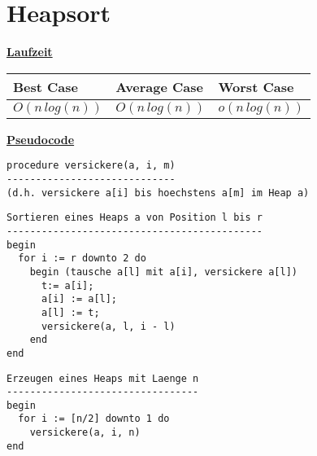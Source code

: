 \documentclass[a4paper]{report}
\begin{document}
\chapter*{Heapsort}

\underline{\bf{Laufzeit}}

\begin{tabular}{|l|l|l|}
\hline
Best Case    & Average Case  &  Worst Case\\ \hline
$O(n\,log(n))$ & $O(n\,log(n))$  &  $o(n\,log(n))$  \\ \hline
\end{tabular}

\underline{\bf{Pseudocode}}

\begin{lstlisting}
procedure versickere(a, i, m)
-----------------------------
(d.h. versickere a[i] bis hoechstens a[m] im Heap a)
\end{lstlisting}

\begin{lstlisting}
Sortieren eines Heaps a von Position l bis r
--------------------------------------------
begin
  for i := r downto 2 do
    begin (tausche a[l] mit a[i], versickere a[l]) 
      t:= a[i];
      a[i] := a[l];
      a[l] := t; 
      versickere(a, l, i - l)
    end
end
\end{lstlisting}

\begin{lstlisting}
Erzeugen eines Heaps mit Laenge n
---------------------------------
begin
  for i := [n/2] downto 1 do
    versickere(a, i, n) 
end
\end{lstlisting}
\end{document}
